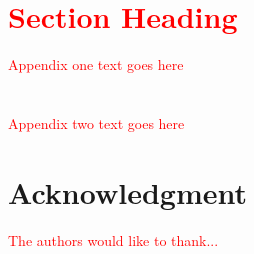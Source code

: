 \documentclass[journal]{IEEEtran}
\newcommand{\note}{\textcolor{red}} %
\begin{document}
\section{\note{Section Heading}}
\note{Appendix one text goes here}

\section{}
\note{Appendix two text goes here}

\section*{Acknowledgment}
\note{The authors would like to thank...}


 

\end{document}
